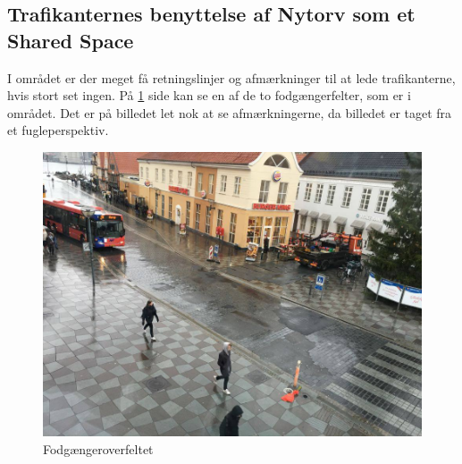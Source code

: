 \subsection{Trafikanternes benyttelse af Nytorv som et Shared Space}
\label{benyttelse_omrade}
I området er der meget få retningslinjer og afmærkninger til at lede trafikanterne, hvis stort set ingen. På \cref{fig:Fodfelt} side \pageref{fig:Fodfelt} kan se en af de to fodgængerfelter, som er i området. Det er på billedet let nok at se afmærkningerne, da billedet er taget fra et fugleperspektiv.

\begin{figure}[htbp]
   \centering
   \begin{adjustbox}{max width=\textwidth}
     \includegraphics[scale=0.3]{figures/Billederogfigur/Fodfelt.jpg}
  \end{adjustbox}
   \caption{Fodgængeroverfeltet}
   \label{fig:Fodfelt}
 \end{figure}

